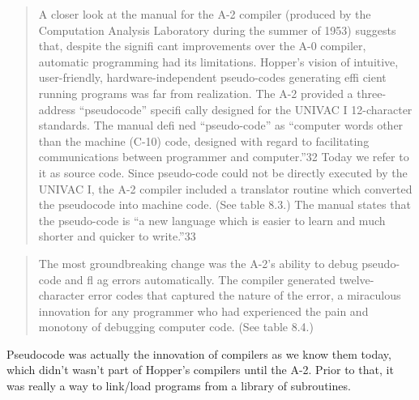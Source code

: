 \begin{quotation}
A closer look at the manual for the A-2 compiler (produced
by the Computation Analysis Laboratory during the summer of
1953) suggests that, despite the signifi cant improvements over
the A-0 compiler, automatic programming had its limitations.
Hopper’s vision of intuitive, user-friendly, hardware-independent
pseudo-codes generating effi cient running programs was far
from realization. The A-2 provided a three-address “pseudocode” specifi cally designed for the UNIVAC I 12-character standards. The manual defi ned “pseudo-code” as “computer words
other than the machine (C-10) code, designed with regard to
facilitating communications between programmer and computer.”32 Today we refer to it as source code. Since pseudo-code
could not be directly executed by the UNIVAC I, the A-2 compiler included a translator routine which converted the pseudocode into machine code. (See table 8.3.)
The manual states that the pseudo-code is “a new language
which is easier to learn and much shorter and quicker to write.”33
\end{quotation}

\begin{quotation}
 The most groundbreaking change was the A-2's ability to debug
pseudo-code and fl ag errors automatically. The compiler generated twelve-character error codes that captured the nature of the
error, a miraculous innovation for any programmer who had
experienced the pain and monotony of debugging computer
code. (See table 8.4.)
\end{quotation}

Pseudocode was actually the innovation of compilers as we know them today,
which didn't wasn't part of Hopper's compilers until the A-2.
Prior to that, it was really a way to link/load programs from a library of subroutines.

